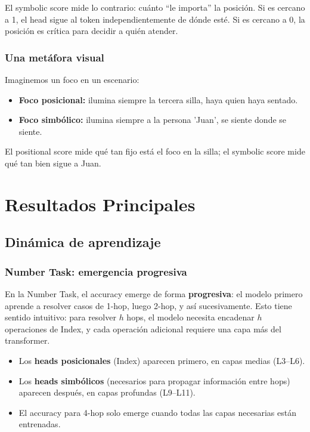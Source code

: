\documentclass[12pt,a4paper,oneside]{report}
\begin{document}
El symbolic score mide lo contrario: cuánto ``le importa'' la posición. Si es cercano a 1, el head sigue al token independientemente de dónde esté. Si es cercano a 0, la posición es crítica para decidir a quién atender.

\subsection{Una metáfora visual}

Imaginemos un foco en un escenario:
\begin{itemize}
    \item \textbf{Foco posicional:} ilumina siempre la tercera silla, haya quien haya sentado.
    \item \textbf{Foco simbólico:} ilumina siempre a la persona 'Juan', se siente donde se siente.
\end{itemize}
El positional score mide qué tan fijo está el foco en la silla; el symbolic score mide qué tan bien sigue a Juan.

\newpage

\chapter{Resultados Principales}

\section{Dinámica de aprendizaje}

\subsection{Number Task: emergencia progresiva}

En la Number Task, el accuracy emerge de forma \textbf{progresiva}: el modelo primero aprende a resolver casos de 1-hop, luego 2-hop, y así sucesivamente. Esto tiene sentido intuitivo: para resolver $h$ hops, el modelo necesita encadenar $h$ operaciones de Index, y cada operación adicional requiere una capa más del transformer.

\begin{itemize}
    \item Los \textbf{heads posicionales} (Index) aparecen primero, en capas medias (L3--L6).
    \item Los \textbf{heads simbólicos} (necesarios para propagar información entre hops) aparecen después, en capas profundas (L9--L11).
    \item El accuracy para 4-hop solo emerge cuando todas las capas necesarias están entrenadas.
\end{itemize}
\end{document}
